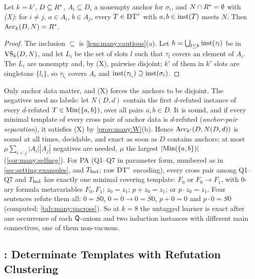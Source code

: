 \begin{theorem}[pigeonhole]\label{thm:many:pigeonhole}
Let $k=k'$, $D\subseteq R^{*}$, $A_i\subseteq D_i$ a nonempty anchor for $\sigma_i$, and $N\cap R^{*}=\emptyset$ with
\emph{(X)}: for $i\neq j$, $a\in A_i$, $b\in A_j$, every $T\in\mathrm{DT}^{\circ}$ with $a,b\in\mathrm{inst}(T)$ meets $N$. Then
$\mathrm{Acc}_k(D,N)=R^{*}$.
\end{theorem}
\begin{proof}
The inclusion $\subseteq$ is \cref{lem:many:cautious}(a). Let $h=\bigcup_{l\le k}\mathrm{inst}(\tau_l)$ be in
$\mathrm{VS}_k(D,N)$, and let $L_i$ be the set of slots $l$ such that $\tau_l$ covers an element of $A_i$. The $L_i$ are
nonempty and, by (X), pairwise disjoint; $k'$ of them in $k'$ slots are singletons $\{l_i\}$, so $\tau_{l_i}$ covers $A_i$
and $\mathrm{inst}(\tau_{l_i})\supseteq\mathrm{inst}(\sigma_i)$.
\end{proof}

Only anchor data matter, and (X) forces the anchors to be disjoint. The negatives need no labels: let $N(D,d)$ contain the
first $d$-refuted instance of every $d$-refuted $T\in\mathrm{Min}(\{a,b\})$, over all pairs $a,b\in D$. It is sound, and if every
minimal template of every cross pair of anchor data is $d$-refuted (\emph{anchor-pair separation}), it satisfies (X) by
\cref{prop:many:W}(b). Hence $\mathrm{Acc}_{k'}(D,N(D,d))$ is sound at all times, decidable, and exact as soon as $D$ contains
anchors; at most $\mu\sum_{i<j}|A_i||A_j|$ negatives are needed, $\mu$ the largest $|\mathrm{Min}(\{a,b\})|$
(\cref{cor:many:selfneg}). For PA (Q1--Q7 in parameter form, numbered as in \cref{sec:setting:examples}, and $T_{\mathrm{Ind}}$;
raw $\mathrm{DT}^{\circ}$ encoding), every cross pair among Q1--Q7 and $T_{\mathrm{Ind}}$ has exactly one minimal covering template: $F_0$ or
$F_0\to F_1$, with $0$-ary formula metavariables $F_0,F_1$; $z_0=z_1$; $p+z_0=z_1$; or $p\cdot z_0=z_1$. Four sentences refute them all: $0=S0$, $0=0\to0=S0$, $p+0=0$ and
$p\cdot0=S0$ (computed; \cref{tab:many:pacross}). So at $k=8$ the untagged learner is exact after one occurrence of each
$\mathsf{Q}$-axiom and two induction instances with different main connectives, one of them non-vacuous.

\subsection{\texorpdfstring{\DTRC}{DTRC}: Determinate Templates with Refutation Clustering}\label{sec:many:dtrc}

